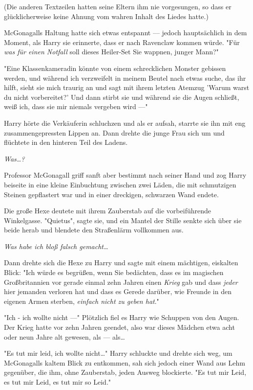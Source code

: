 {(Die anderen Textzeilen hatten seine Eltern ihm nie vorgesungen, so dass er glücklicherweise keine Ahnung vom wahren Inhalt des Liedes hatte.)

McGonagalls Haltung hatte sich etwas entspannt --- jedoch hauptsächlich in dem Moment, als Harry sie erinnerte, dass er nach Ravenclaw kommen würde. "Für \emph{was für einen Notfall} soll dieses Heiler-Set Sie wappnen, junger Mann?"

"Eine Klassenkameradin könnte von einem schrecklichen Monster gebissen werden, und während ich verzweifelt in meinem Beutel nach etwas suche, das ihr hilft, sieht sie mich traurig an und sagt mit ihrem letzten Atemzug 'Warum warst du nicht vorbereitet?' Und dann stirbt sie und während sie die Augen schließt, weiß ich, dass sie mir niemals vergeben wird ---"

Harry hörte die Verkäuferin schluchzen und als er aufsah, starrte sie ihn mit eng zusammengepressten Lippen an. Dann drehte die junge Frau sich um und flüchtete in den hinteren Teil des Ladens.

\emph{Was…?}

Professor McGonagall griff sanft aber bestimmt nach seiner Hand und zog Harry beiseite in eine kleine Einbuchtung zwischen zwei Läden, die mit schmutzigen Steinen gepflastert war und in einer dreckigen, schwarzen Wand endete.

Die große Hexe deutete mit ihrem Zauberstab auf die vorbeiführende Winkelgasse. "Quietus", sagte sie, und ein Mantel der Stille senkte sich über sie beide herab und blendete den Straßenlärm vollkommen aus.

\emph{Was habe ich bloß falsch gemacht…}

Dann drehte sich die Hexe zu Harry und sagte mit einem mächtigen, eiskalten Blick: "Ich würde es begrüßen, wenn Sie bedächten, dass es im magischen Großbritannien vor gerade einmal zehn Jahren einen \emph{Krieg} gab und dass \emph{jeder} hier jemanden verloren hat und dass es Gerede darüber, wie Freunde in den eigenen Armen sterben, \emph{einfach nicht zu geben hat}."

"Ich - ich wollte nicht ---" Plötzlich fiel es Harry wie Schuppen von den Augen. Der Krieg hatte vor zehn Jahren geendet, also war dieses Mädchen etwa acht oder neun Jahre alt gewesen, als --- als…

"Es tut mir leid, ich wollte nicht…" Harry schluckte und drehte sich weg, um McGonagalls kaltem Blick zu entkommen, sah sich jedoch einer Wand aus Lehm gegenüber, die ihm, ohne Zauberstab, jeden Ausweg blockierte. "Es tut mir Leid, es tut mir Leid, es tut mir so Leid."

}
